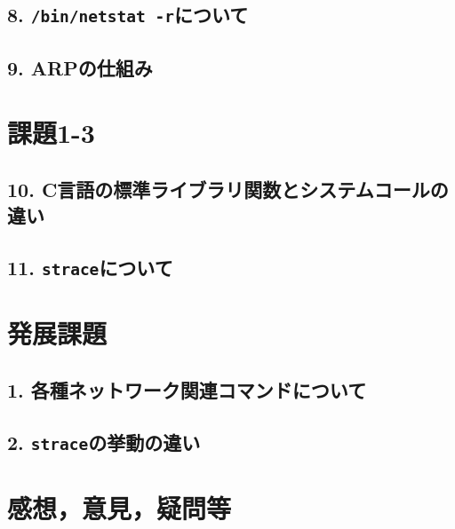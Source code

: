 \documentclass[10pt,titlepage]{jsarticle}
\begin{document}
\subsection*{8. \texttt{/bin/netstat -r}について}


\subsection*{9. ARPの仕組み}


\section{課題1-3}

\subsection*{10. C言語の標準ライブラリ関数とシステムコールの違い}

\subsection*{11. \texttt{strace}について}


\section{発展課題}

\subsection*{1. 各種ネットワーク関連コマンドについて}

\subsection*{2. \texttt{strace}の挙動の違い} 

\section{感想，意見，疑問等}
\end{document}

